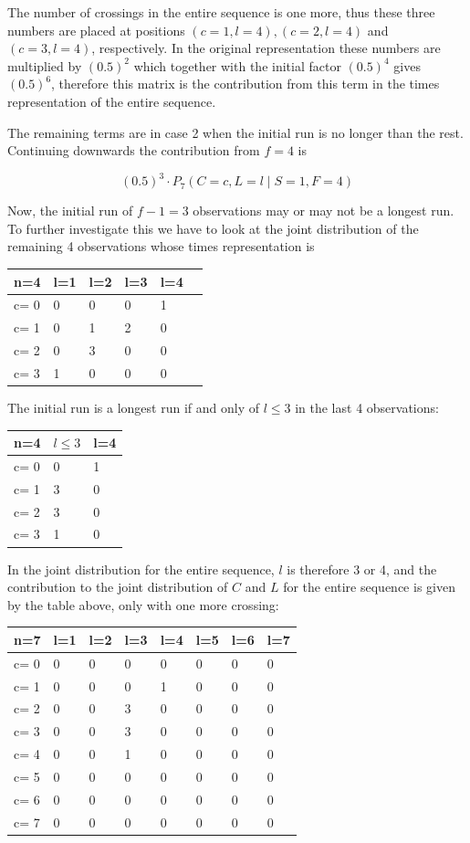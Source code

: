 The number of crossings in the entire sequence is one more, thus these three numbers are placed at positions $(c=1,l=4), (c=2,l=4)$ and $(c=3,l=4)$, respectively. In the original representation these numbers are multiplied by $(0.5)^2$ which together with the initial factor $(0.5)^4$ gives $(0.5)^6$, therefore this matrix is the contribution from this term in the times representation of the entire sequence.

The remaining terms are in case 2 when the initial run is no longer than the rest. Continuing downwards the contribution from $f=4$ is 

$$(0.5)^3 \cdot   P_7 (C=c, L=l \mid S=1,F=4)$$

Now, the initial run of $f-1=3$ observations may or may not be a longest run. To further investigate this we have to look at the joint distribution of the remaining 4 observations whose times representation is 

\begin{tabular}{l | l l l l l}
\hline
n=4&l=1&l=2&l=3&l=4\\
\hline
c= 0& 0& 0& 0& 1\\
c= 1& 0& 1& 2& 0\\
c= 2& 0& 3& 0& 0\\
c= 3& 1& 0& 0& 0\\
\hline
\end{tabular}

The initial run is a longest run if and only of $l \leq 3$ in the last 4 observations:

\begin{tabular}{l | l l}
\hline
n=4&$l \leq 3$&l=4\\
\hline
c= 0& 0& 1\\
c= 1& 3& 0\\
c= 2& 3& 0\\
c= 3& 1& 0\\
\hline
\end{tabular}

In the joint distribution for the entire sequence, $l$ is therefore 3 or 4, and the contribution to the joint distribution of $C$ and $L$ for the entire sequence is given by the table above, only with one more crossing:

\begin{tabular}{l | l l l l l l l}
\hline
n=7&l=1&l=2&l=3&l=4&l=5&l=6&l=7\\
\hline
c= 0& 0& 0& 0& 0& 0& 0& 0\\
c= 1& 0& 0& 0& 1& 0& 0& 0\\
c= 2& 0& 0& 3& 0& 0& 0& 0\\
c= 3& 0& 0& 3& 0& 0& 0& 0\\
c= 4& 0& 0& 1& 0& 0& 0& 0\\
c= 5& 0& 0& 0& 0& 0& 0& 0\\
c= 6& 0& 0& 0& 0& 0& 0& 0\\
c= 7& 0& 0& 0& 0& 0& 0& 0\\
\hline
\end{tabular}


